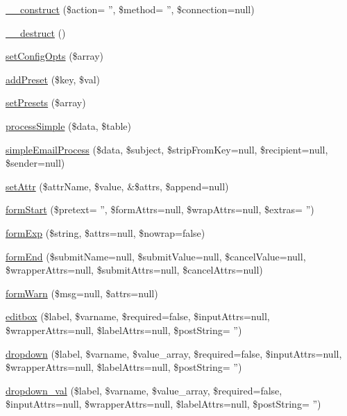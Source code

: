 \begin{DoxyCompactItemize}
\item 
\hyperlink{classg_form_abd4079f66c2a04d81af8e7674b8777e0}{\-\_\-\-\_\-construct} (\$action= '', \$method= '', \$connection=null)
\item 
\hyperlink{classg_form_a421831a265621325e1fdd19aace0c758}{\-\_\-\-\_\-destruct} ()
\item 
\hyperlink{classg_form_a6d7aab75f025c9a2b4e9421e737cca1a}{set\-Config\-Opts} (\$array)
\item 
\hyperlink{classg_form_a00c5ffb7a72ff9e211ddfda87f81eec4}{add\-Preset} (\$key, \$val)
\item 
\hyperlink{classg_form_a5e1abd66a8894062a2270a1361b06eaa}{set\-Presets} (\$array)
\item 
\hyperlink{classg_form_a9b55cfaa213f67e6d21e18a22efab029}{process\-Simple} (\$data, \$table)
\item 
\hyperlink{classg_form_a0daa18108440376569f4559397af3cbf}{simple\-Email\-Process} (\$data, \$subject, \$strip\-From\-Key=null, \$recipient=null, \$sender=null)
\item 
\hyperlink{classg_form_a322e447d82391216d0146527419e4b90}{set\-Attr} (\$attr\-Name, \$value, \&\$attrs, \$append=null)
\item 
\hyperlink{classg_form_a8d5713945f511d17703c14b1ef16c3e1}{form\-Start} (\$pretext= '', \$form\-Attrs=null, \$wrap\-Attrs=null, \$extras= '')
\item 
\hyperlink{classg_form_a1586aa378475bbd4633b5f6e33ca74b4}{form\-Exp} (\$string, \$attrs=null, \$nowrap=false)
\item 
\hyperlink{classg_form_a8a113622320d7b13d2c765593f42b65a}{form\-End} (\$submit\-Name=null, \$submit\-Value=null, \$cancel\-Value=null, \$wrapper\-Attrs=null, \$submit\-Attrs=null, \$cancel\-Attrs=null)
\item 
\hyperlink{classg_form_a7cbbafbeec97fe9c9e4a3152e7065227}{form\-Warn} (\$msg=null, \$attrs=null)
\item 
\hyperlink{classg_form_a1f4232ed79c9b88bc3c5b47b025e7744}{editbox} (\$label, \$varname, \$required=false, \$input\-Attrs=null, \$wrapper\-Attrs=null, \$label\-Attrs=null, \$post\-String= '')
\item 
\hyperlink{classg_form_a6ea9943a48bcd8c586e3fe78b8c71562}{dropdown} (\$label, \$varname, \$value\-\_\-array, \$required=false, \$input\-Attrs=null, \$wrapper\-Attrs=null, \$label\-Attrs=null, \$post\-String= '')
\item 
\hyperlink{classg_form_aeed35dae69403ccf2a93a69b5d7abe61}{dropdown\-\_\-val} (\$label, \$varname, \$value\-\_\-array, \$required=false, \$input\-Attrs=null, \$wrapper\-Attrs=null, \$label\-Attrs=null, \$post\-String= '')

\end{DoxyCompactItemize}
